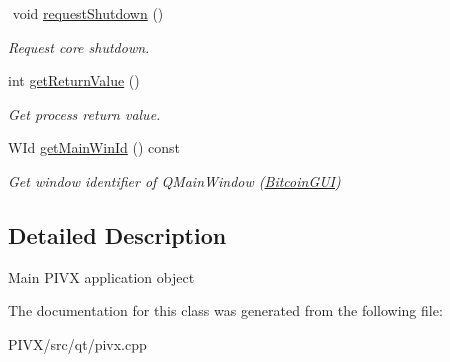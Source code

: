 \begin{DoxyCompactItemize}
$$\mbox{\label{class_bitcoin_application_a37c560d4c04d14a6da151b82caf8888f}} 
void \mbox{\hyperlink{class_bitcoin_application_a37c560d4c04d14a6da151b82caf8888f}{request\+Shutdown}} ()
\begin{DoxyCompactList}\small\item\em Request core shutdown. \end{DoxyCompactList}\item 
\mbox{\label{class_bitcoin_application_a9d3e9f2aa0663d41976b20d33702992c}} 
int \mbox{\hyperlink{class_bitcoin_application_a9d3e9f2aa0663d41976b20d33702992c}{get\+Return\+Value}} ()
\begin{DoxyCompactList}\small\item\em Get process return value. \end{DoxyCompactList}\item 
\mbox{\label{class_bitcoin_application_aea7267368b0e232e2fe8485f29ca4180}} 
W\+Id \mbox{\hyperlink{class_bitcoin_application_aea7267368b0e232e2fe8485f29ca4180}{get\+Main\+Win\+Id}} () const
\begin{DoxyCompactList}\small\item\em Get window identifier of Q\+Main\+Window (\mbox{\hyperlink{class_bitcoin_g_u_i}{Bitcoin\+G\+UI}}) \end{DoxyCompactList}\end{DoxyCompactItemize}


\subsection{Detailed Description}
Main P\+I\+VX application object 

The documentation for this class was generated from the following file\+:\begin{DoxyCompactItemize}
\item 
P\+I\+V\+X/src/qt/pivx.\+cpp\end{DoxyCompactItemize}
